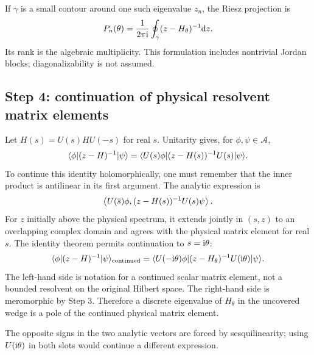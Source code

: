If $\gamma$ is a small contour around one such eigenvalue $z_n$, the Riesz
projection is
\begin{equation}
  P_n(\theta)
  =\frac{1}{2\pi\mathrm{i}}\oint_\gamma
  (z-H_\theta)^{-1}\mathrm{d} z .
  \label{eq:abc-app-riesz-projection}
\end{equation}
Its rank is the algebraic multiplicity.  This formulation includes
nontrivial Jordan blocks; diagonalizability is not assumed.

\subsection*{Step 4: continuation of physical resolvent matrix elements}

Let $H(s)=U(s)HU(-s)$ for real $s$.  Unitarity gives, for
$\phi,\psi\in\mathcal A$,
\begin{equation}
  \langle \phi \rvert(z-H)^{-1}\lvert \psi \rangle
  =\langle U(s)\phi \rvert(z-H(s))^{-1}U(s)\lvert \psi \rangle .
  \label{eq:abc-real-identity}
\end{equation}
To continue this identity holomorphically, one must remember that the inner
product is antilinear in its first argument.  The analytic expression is
\begin{equation}
  \left\langle U(\overline{s})\phi,(z-H(s))^{-1}U(s)\psi\right\rangle .
  \label{eq:abc-sesquilinear-analytic-expression}
\end{equation}
For $z$ initially above the physical spectrum, it extends jointly in $(s,z)$
to an overlapping complex domain and agrees with the physical matrix element
for real $s$.  The identity theorem permits continuation to
$s=\mathrm{i}\theta$:
\begin{equation}
  \langle \phi \rvert(z-H)^{-1}\lvert \psi \rangle_{\mathrm{continued}}
  =\langle U(-\mathrm{i}\theta)\phi \rvert
  (z-H_\theta)^{-1}U(\mathrm{i}\theta)\lvert \psi \rangle .
  \label{eq:abc-app-continued-matrix-element}
\end{equation}
The left-hand side is notation for a continued scalar matrix element, not a
bounded resolvent on the original Hilbert space.  The right-hand side is
meromorphic by Step 3.  Therefore a discrete eigenvalue of $H_\theta$ in the
uncovered wedge is a pole of the continued physical matrix element.

The opposite signs in the two analytic vectors are forced by sesquilinearity;
using $U(\mathrm{i}\theta)$ in both slots would continue a different expression.

